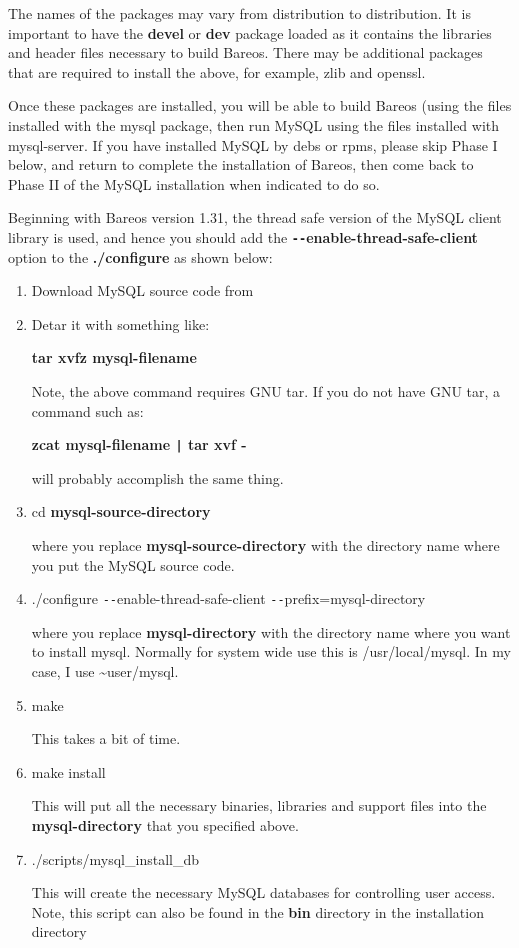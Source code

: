 The names of the packages may vary from distribution to
distribution. It is important to have the {\bf devel} or {\bf dev} package loaded as
it contains the libraries and header files necessary to build
Bareos.  There may be additional packages that are required to
install the above, for example, zlib and openssl.

Once these packages are installed, you will be able to build Bareos (using
the files installed with the mysql package, then run MySQL using the
files installed with mysql-server. If you have installed MySQL by debs or rpms,
please skip Phase I below, and return to complete the installation of
Bareos, then come back to Phase II of the MySQL installation when indicated
to do so.

Beginning with Bareos version 1.31, the thread safe version of the
MySQL client library is used, and hence you should add the {\bf
\verb:--:enable-thread-safe-client} option to the {\bf
./configure} as shown below:

\begin{enumerate}
\item Download MySQL source code from

\item Detar it with something like:

   {\bf tar xvfz mysql-filename}

Note, the above command requires GNU tar. If you do not  have GNU tar, a
command such as:

{\bf zcat mysql-filename \verb+|+ tar xvf - }

will probably accomplish the same thing.

\item cd {\bf mysql-source-directory}

   where you replace {\bf mysql-source-directory} with the  directory name where
   you put the MySQL source code.

\item ./configure \verb:--:enable-thread-safe-client \verb:--:prefix=mysql-directory

   where you replace {\bf mysql-directory} with the directory  name where you
   want to install mysql. Normally for system  wide use this is /usr/local/mysql.
   In my case, I use  \~{}user/mysql.

\item make

   This takes a bit of time.

\item make install

   This will put all the necessary binaries, libraries and support  files into
   the {\bf mysql-directory} that you specified above.

\item ./scripts/mysql\_install\_db

   This will create the necessary MySQL databases for controlling  user access.
Note, this script can also be found in the  {\bf bin} directory in the
installation directory

\end{enumerate}

